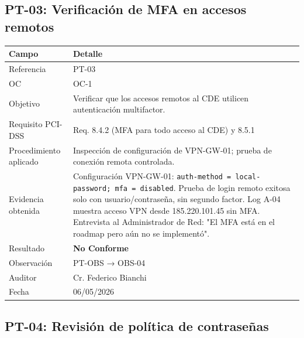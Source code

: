 \documentclass[11pt,a4paper]{article}
\begin{document}
\subsection{PT-03: Verificación de MFA en accesos remotos}

\begin{tabularx}{\textwidth}{P{5cm}L}
\toprule
\textbf{Campo} & \textbf{Detalle} \\
\midrule
Referencia & PT-03 \\
OC & OC-1 \\
Objetivo & Verificar que los accesos remotos al CDE utilicen autenticación multifactor. \\
Requisito PCI-DSS & Req. 8.4.2 (MFA para todo acceso al CDE) y 8.5.1 \\
Procedimiento aplicado & Inspección de configuración de VPN-GW-01; prueba de conexión remota controlada. \\
Evidencia obtenida & Configuración VPN-GW-01: \texttt{auth-method = local-password; mfa = disabled}. Prueba de login remoto exitosa solo con usuario/contraseña, sin segundo factor. Log A-04 muestra acceso VPN desde 185.220.101.45 sin MFA. Entrevista al Administrador de Red: "El MFA está en el roadmap pero aún no se implementó". \\
Resultado & \textbf{No Conforme} \\
Observación & PT-OBS → OBS-04 \\
Auditor & Cr. Federico Bianchi \\
Fecha & 06/05/2026 \\
\bottomrule
\end{tabularx}

\subsection{PT-04: Revisión de política de contraseñas}
\end{document}
